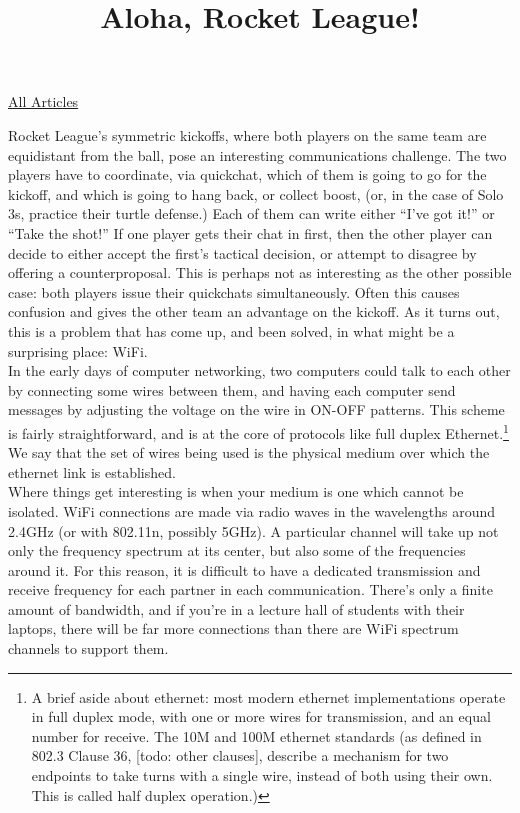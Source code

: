 \documentclass{article}
\title{Aloha, Rocket League!}
\begin{document}
\maketitle
\begin{center}
  \href{../index.html}{All Articles}
\end{center}

Rocket League’s symmetric kickoffs, where both players on the same team are equidistant from the ball, pose an interesting communications challenge. The two players have to coordinate, via quickchat, which of them is going to go for the kickoff, and which is going to hang back, or collect boost, (or, in the case of Solo 3s, practice their turtle defense.) Each of them can write either ``I've got it!'' or ``Take the shot!'' If one player gets their chat in first, then the other player can decide to either accept the first's tactical decision, or attempt to disagree by offering a counterproposal. This is perhaps not as interesting as the other possible case: both players issue their quickchats simultaneously. Often this causes confusion and gives the other team an advantage on the kickoff. As it turns out, this is a problem that has come up, and been solved, in what might be a surprising place: WiFi.\\

In the early days of computer networking, two computers could talk to each other by connecting some wires between them, and having each computer send messages by adjusting the voltage on the wire in ON-OFF patterns. This scheme is fairly straightforward, and is at the core of protocols like full duplex Ethernet.\footnote{A brief aside about ethernet: most modern ethernet implementations operate in full duplex mode, with one or more wires for transmission, and an equal number for receive. The 10M and 100M ethernet standards (as defined in 802.3 Clause 36, [todo: other clauses], describe a mechanism for two endpoints to take turns with a single wire, instead of both using their own. This is called half duplex operation.)} We say that the set of wires being used is the physical medium over which the ethernet link is established.\\

Where things get interesting is when your medium is one which cannot be isolated. WiFi connections are made via radio waves in the wavelengths around 2.4GHz (or with 802.11n, possibly 5GHz). A particular channel will take up not only the frequency spectrum at its center, but also some of the frequencies around it. For this reason, it is difficult to have a dedicated transmission and receive frequency for each partner in each communication. There's only a finite amount of bandwidth, and if you're in a lecture hall of students with their laptops, there will be far more connections than there are WiFi spectrum channels to support them.\\
\end{document}
